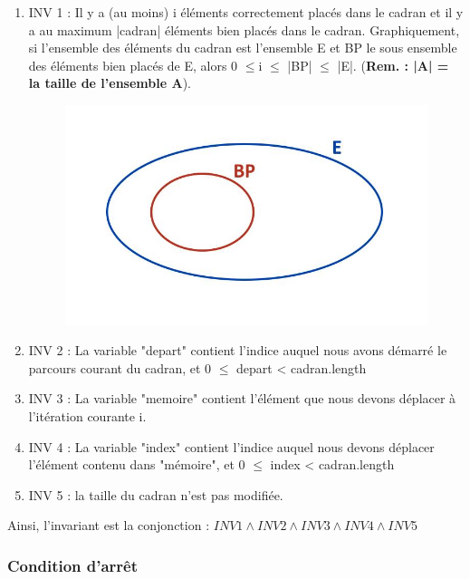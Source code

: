 \documentclass[a4paper, 12pt]{article}
\begin{document}
\begin{enumerate}
\item INV 1 : Il y a (au moins) i éléments correctement placés dans le cadran et il y a au maximum |cadran| éléments bien placés dans le cadran.
Graphiquement, si l'ensemble des éléments du cadran est l'ensemble E et BP le sous ensemble des éléments bien placés de E, alors 0 $\le$i $\le$ |BP| $\le$ |E|. (\textbf{Rem. : |A| = la taille de l'ensemble A}).\\

\begin{figure}[h]
   \includegraphics[scale=0.5]{Ensembles}
\end{figure}


\item INV 2 : La variable "depart" contient l'indice auquel nous avons démarré le parcours courant du cadran, et 0 $\le$ depart < cadran.length

\item INV 3 : La variable "memoire" contient l'élément que nous devons déplacer à l'itération courante i.

\item INV 4 : La variable "index" contient l'indice auquel nous devons déplacer l'élément contenu dans "mémoire", et 0 $\le$ index < cadran.length

\item INV 5 : la taille du cadran n'est pas modifiée.
\end{enumerate}

Ainsi, l'invariant est la conjonction : $INV 1 \wedge INV 2 \wedge INV 3 \wedge INV 4 \wedge INV 5$



\subsubsection*{Condition d'arrêt}
\end{document}
